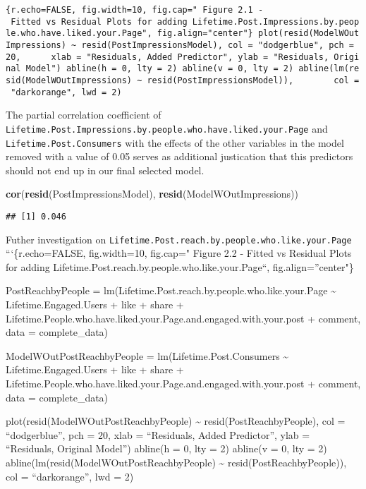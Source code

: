 \documentclass[
]{article}
\newenvironment{Shaded}{\begin{snugshade}}{\end{snugshade}}
\newcommand{\KeywordTok}[1]{\textcolor[rgb]{0.13,0.29,0.53}{\textbf{#1}}}
\newcommand{\NormalTok}[1]{#1}
\begin{document}
\texttt{\{r.echo=FALSE,\ fig.width=10,\ fig.cap="\ Figure\ 2.1\ -\ Fitted\ vs\ Residual\ Plots\ for\ adding\ Lifetime.Post.Impressions.by.people.who.have.liked.your.Page",\ fig.align="center"\}\ plot(resid(ModelWOutImpressions)\ \textasciitilde{}\ resid(PostImpressionsModel),\ col\ =\ "dodgerblue",\ pch\ =\ 20,\ \ \ \ \ \ xlab\ =\ "Residuals,\ Added\ Predictor",\ ylab\ =\ "Residuals,\ Original\ Model")\ abline(h\ =\ 0,\ lty\ =\ 2)\ abline(v\ =\ 0,\ lty\ =\ 2)\ abline(lm(resid(ModelWOutImpressions)\ \textasciitilde{}\ resid(PostImpressionsModel)),\ \ \ \ \ \ \ \ col\ =\ "darkorange",\ lwd\ =\ 2)}

The partial correlation coefficient of
\texttt{Lifetime.Post.Impressions.by.people.who.have.liked.your.Page}
and \texttt{Lifetime.Post.Consumers} with the effects of the other
variables in the model removed with a value of 0.05 serves as additional
justication that this predictors should not end up in our final selected
model.

\begin{Shaded}
\begin{Highlighting}[]
\KeywordTok{cor}\NormalTok{(}\KeywordTok{resid}\NormalTok{(PostImpressionsModel), }\KeywordTok{resid}\NormalTok{(ModelWOutImpressions))}
\end{Highlighting}
\end{Shaded}

\begin{verbatim}
## [1] 0.046
\end{verbatim}

Futher investigation on
\texttt{Lifetime.Post.reach.by.people.who.like.your.Page}
```\{r.echo=FALSE, fig.width=10, fig.cap=" Figure 2.2 - Fitted vs
Residual Plots for adding
Lifetime.Post.reach.by.people.who.like.your.Page``,
fig.align=''center"\}

PostReachbyPeople = lm(Lifetime.Post.reach.by.people.who.like.your.Page
\textasciitilde{} Lifetime.Engaged.Users + like + share +
Lifetime.People.who.have.liked.your.Page.and.engaged.with.your.post +
comment, data = complete\_data)

ModelWOutPostReachbyPeople = lm(Lifetime.Post.Consumers
\textasciitilde{} Lifetime.Engaged.Users + like + share +
Lifetime.People.who.have.liked.your.Page.and.engaged.with.your.post +
comment, data = complete\_data)

plot(resid(ModelWOutPostReachbyPeople) \textasciitilde{}
resid(PostReachbyPeople), col = ``dodgerblue'', pch = 20, xlab =
``Residuals, Added Predictor'', ylab = ``Residuals, Original Model'')
abline(h = 0, lty = 2) abline(v = 0, lty = 2)
abline(lm(resid(ModelWOutPostReachbyPeople) \textasciitilde{}
resid(PostReachbyPeople)), col = ``darkorange'', lwd = 2)
\end{document}
